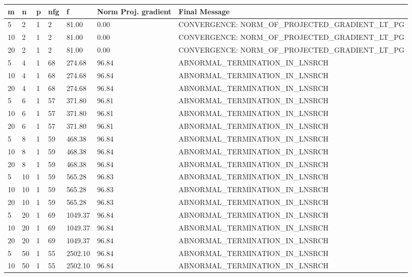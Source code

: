 \begin{center}
  \begin{table}
    \begin{tabular}{|l|l|l|l|l|p{1.4cm}|p{8.0cm}|}
      \hline
m & n & p & nfg & f & Norm Proj. gradient & Final Message \\ \hline
5 & 2 & 1 & 2 & 81.00 & 0.00 & CONVERGENCE: NORM\_OF\_PROJECTED\_GRADIENT\_LT\_PG \\
10 & 2 & 1 & 2 & 81.00 & 0.00 & CONVERGENCE: NORM\_OF\_PROJECTED\_GRADIENT\_LT\_PG \\
20 & 2 & 1 & 2 & 81.00 & 0.00 & CONVERGENCE: NORM\_OF\_PROJECTED\_GRADIENT\_LT\_PG \\
5 & 4 & 1 & 68 & 274.68 & 96.84 & ABNORMAL\_TERMINATION\_IN\_LNSRCH \\
10 & 4 & 1 & 68 & 274.68 & 96.84 & ABNORMAL\_TERMINATION\_IN\_LNSRCH \\
20 & 4 & 1 & 68 & 274.68 & 96.84 & ABNORMAL\_TERMINATION\_IN\_LNSRCH \\
5 & 6 & 1 & 57 & 371.80 & 96.81 & ABNORMAL\_TERMINATION\_IN\_LNSRCH \\
10 & 6 & 1 & 57 & 371.80 & 96.81 & ABNORMAL\_TERMINATION\_IN\_LNSRCH \\
20 & 6 & 1 & 57 & 371.80 & 96.81 & ABNORMAL\_TERMINATION\_IN\_LNSRCH \\
5 & 8 & 1 & 59 & 468.38 & 96.84 & ABNORMAL\_TERMINATION\_IN\_LNSRCH \\
10 & 8 & 1 & 59 & 468.38 & 96.84 & ABNORMAL\_TERMINATION\_IN\_LNSRCH \\
20 & 8 & 1 & 59 & 468.38 & 96.84 & ABNORMAL\_TERMINATION\_IN\_LNSRCH \\
5 & 10 & 1 & 59 & 565.28 & 96.83 & ABNORMAL\_TERMINATION\_IN\_LNSRCH \\
10 & 10 & 1 & 59 & 565.28 & 96.83 & ABNORMAL\_TERMINATION\_IN\_LNSRCH \\
20 & 10 & 1 & 59 & 565.28 & 96.83 & ABNORMAL\_TERMINATION\_IN\_LNSRCH \\
5 & 20 & 1 & 69 & 1049.37 & 96.84 & ABNORMAL\_TERMINATION\_IN\_LNSRCH \\
10 & 20 & 1 & 69 & 1049.37 & 96.84 & ABNORMAL\_TERMINATION\_IN\_LNSRCH \\
20 & 20 & 1 & 69 & 1049.37 & 96.84 & ABNORMAL\_TERMINATION\_IN\_LNSRCH \\
5 & 50 & 1 & 55 & 2502.10 & 96.84 & ABNORMAL\_TERMINATION\_IN\_LNSRCH \\
10 & 50 & 1 & 55 & 2502.10 & 96.84 & ABNORMAL\_TERMINATION\_IN\_LNSRCH \\

\end{tabular}
\end{table}
\end{center}
